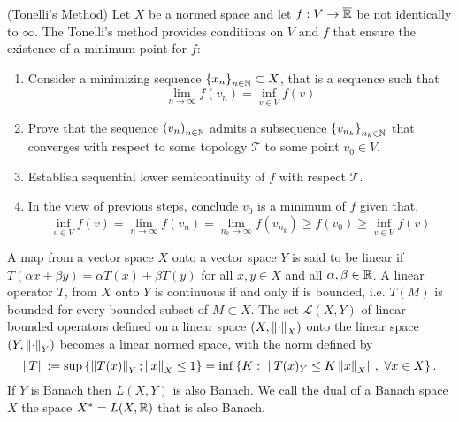 \begin{theorem}(Tonelli's Method)
	Let $X$ be a normed space and let $f:V\rightarrow \overline{\mathbb{R}}$ be not identically to $\infty$. The Tonelli's method provides conditions on $V$ and $f$ that ensure the existence of a minimum point for $f$:
	\begin{enumerate}
		\item Consider a minimizing sequence $\left\lbrace x_n \right\rbrace_{n\in \mathbb{N}}\subset X$, that is a sequence such that
		\begin{equation*}
		\lim_{n\rightarrow\infty}f(v_n)=\inf_{v\in V}f(v)
		\end{equation*}
		\item Prove that the sequence $\left( v_n \right)_{n\in \mathbb{N}}$ admits a subsequence $\left\lbrace v_{n_k} \right\rbrace_{n_k\in \mathbb{N}}$ that converges with respect to some topology $\mathcal T$ to some point $v_0\in V$.
		\item Establish sequential lower semicontinuity of $f$ with respect $\mathcal T$.
		\item In the view of previous steps, conclude $v_0$ is a minimum of $f$ given that,
		\begin{equation}
			\inf_{v\in V}f(v)=\lim_{n\rightarrow\infty }f(v_n)=\lim_{n_k\rightarrow \infty}f(v_{n_k})\geq f(v_0)\geq \inf_{v\in V}f(v)
		\end{equation}
	\end{enumerate}
\end{theorem}
A map from a vector space $X$ onto a vector space $Y$ is said to be linear if $T(\alpha x+\beta y)=\alpha T(x)+\beta T(y)$ for all $x,y\in X$ and all $\alpha, \beta \in \mathbb{R}$. A linear operator $T$, from $X$ onto $Y$ is continuous if and only if is bounded, i.e. $T(M)$ is bounded for every bounded subset of $M\subset X$. The set $\mathcal{L}(X,Y)$ of linear bounded operators defined on a linear space $(X, \left\|\cdot\right\|_X)$ onto the linear space $(Y, \left\|\cdot\right\|_Y)$ becomes a linear normed space, with the norm defined by
\begin{equation*}
	\norm{T}:=\sup\braces{\norm{T(x)}_Y; \norm{x}_X\leq 1}=\inf\braces{K:\ \norm{T(x)_Y\leq K\norm{x}_X},\ \forall x \in X}.
\end{equation*}
If $Y$ is Banach then $L(X, Y)$ is also Banach. We call the dual of a Banach space $X$ the space $X^*=L(X,\mathbb{R})$ that is also Banach. 

